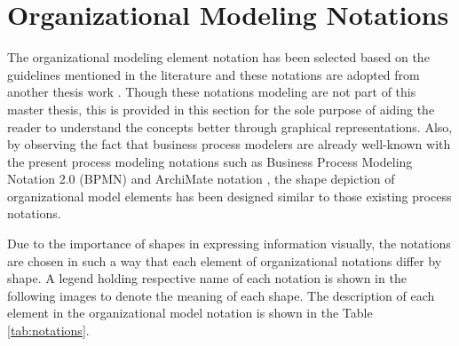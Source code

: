 \section{Organizational Modeling Notations}
\label{sec:resourcecentricorganizationalmodeling}
The organizational modeling element notation has been selected based on the guidelines mentioned in the literature \cite{Moody2009} and these notations are adopted from another thesis work \cite{Sierr2015}. Though these notations modeling are not part of this master thesis, this is provided in this section for the sole purpose of aiding the reader to understand the concepts better through graphical representations. Also, by observing  the fact that business process modelers are already well-known with the present process modeling notations such as Business Process Modeling Notation 2.0 (BPMN) \cite{bpm2011} and ArchiMate notation \cite{arc2013}, the shape depiction of organizational model elements has been designed similar to those existing process notations. 

Due to the importance of shapes in expressing information visually, the notations are chosen in such a way that each element of organizational notations differ by shape. A legend holding respective name of each notation is shown in the following images to denote the meaning of each shape. The description of each element in the organizational model notation is shown in the Table \ref{tab:notations}. 

